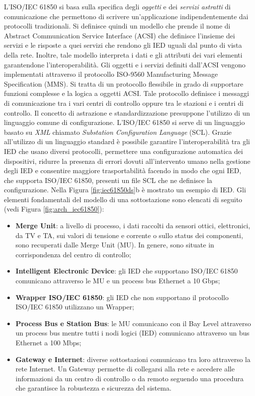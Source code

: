 L'ISO/IEC 61850 si basa sulla specifica degli \emph{oggetti} e dei \emph{servizi astratti} di comunicazione che permettono di scrivere un'applicazione indipendentemente dai protocolli tradizionali. Si definisce quindi un modello che prende il nome di Abstract Communication Service Interface (ACSI) che definisce l'insieme dei servizi e le risposte a quei servizi che rendono gli IED uguali dal punto di vista della rete. Inoltre, tale modello interpreta i dati e gli attributi dei vari elementi garantendone l'interoperabilità. Gli oggetti e i servizi definiti dall'ACSI vengono implementati attraverso il protocollo ISO-9560 Manufacturing Message Specification (MMS). Si tratta di un protocollo flessibile in grado di supportare funzioni complesse e la logica a oggetti ACSI. Tale protocollo definisce i messaggi di comunicazione tra i vari centri di controllo oppure tra le stazioni e i centri di controllo.\newline\newline
Il concetto di astrazione e standardizzazione presuppone l'utilizzo di un linguaggio comune di configurazione. L'ISO/IEC 61850 si serve di un linguaggio basato su \emph{XML} chiamato \emph{Substation Configuration Language} (SCL). Grazie all'utilizzo di un linguaggio standard è possibile garantire l'interoperabilità tra gli IED che usano diversi protocolli, permettere una configurazione automatica dei dispositivi, ridurre la presenza di errori dovuti all'intervento umano nella gestione degli IED e consentire maggiore trasportabilità facendo in modo che ogni IED, che supporta ISO/IEC 61850, presenti un file SCL che ne definisce la configurazione. Nella Figura \ref{fig:iec61850ds}b è mostrato un esempio di IED.\newpage
Gli elementi fondamentali del modello di una sottostazione sono elencati di seguito (vedi Figura \ref{fig:arch_iec61850}):
\begin{itemize}
	\item\textbf{Merge Unit}: a livello di processo, i dati raccolti da sensori ottici, elettronici, da TV e TA, sui valori di tensione e corrente o sullo status dei componenti, sono recuperati dalle Merge Unit (MU). In genere, sono situate in corrispondenza del centro di controllo;
	\item\textbf{Intelligent Electronic Device}: gli IED che supportano ISO/IEC 61850 comunicano attraverso le MU e un process bus Ethernet a 10 Gbps;
	\item\textbf{Wrapper ISO/IEC 61850}: gli IED che non supportano il protocollo ISO/IEC 61850 utilizzano un Wrapper;
	\item\textbf{Process Bus e Station Bus}: le MU comunicano con il Bay Level attraverso un process bus mentre tutti i nodi logici (IED) comunicano attraverso un bus Ethernet a 100 Mbps;
	\item\textbf{Gateway e Internet}: diverse sottostazioni comunicano tra loro attraverso la rete Internet. Un Gateway permette di collegarsi alla rete e accedere alle informazioni da un centro di controllo o da remoto seguendo una procedura che garantisce la robustezza e sicurezza del sistema.
\end{itemize}


